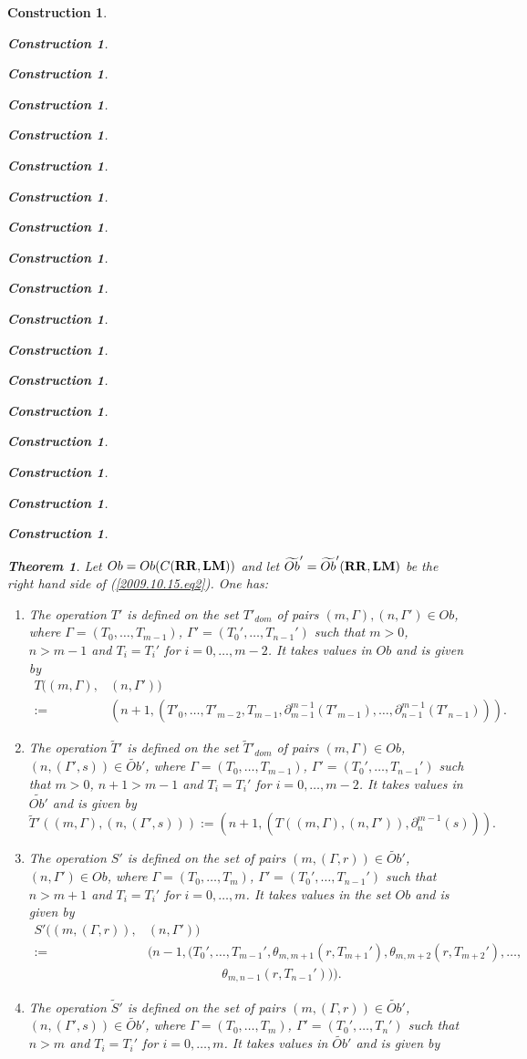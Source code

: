 \documentclass[onecolumn,12pt]{amsart}
\newtheorem{theorem}[proposition]{Theorem}
\numberwithin{proposition}{subsection}
\newtheorem{construction}[proposition]{Construction}
\newcommand{\wt}{\widetilde}
\newcommand{\spc}{{\,\,\,\,\,\,\,}}
\newcommand{\RR}{{\bf RR}}
\newcommand{\LM}{{\bf LM}}
\begin{document}
\begin{construction}
\begin{construction}
\begin{construction}
\begin{construction}
\begin{construction}
\begin{construction}
\begin{construction}
\begin{construction}
\begin{construction}
\begin{construction}
\begin{construction}
\begin{construction}
\begin{construction}
\begin{construction}
\begin{construction}
\begin{construction}
\begin{construction}
\begin{construction}
  
%
\begin{theorem}\label{2015.08.26.th2}
Let $Ob=Ob(C(\RR,\LM))$ and let $\wt{Ob}'=\wt{Ob}'(\RR,\LM)$ be the right hand side of (\ref{2009.10.15.eq2}). One has:
%
\begin{enumerate}
\item The operation $T'$ is defined on the set $T'_{dom}$ of pairs
  $(m,\Gamma),(n,\Gamma')\in Ob$, where $\Gamma=(T_0,\dots,T_{m-1})$,
  $\Gamma'=(T_0',\dots,T_{n-1}')$ such that $m>0$, $n>m-1$ and $T_i=T_i'$ for
  $i=0,\dots,m-2$. It takes values in $Ob$ and is given by
%
\begin{equation*}
  \begin{split}
    T((m,\Gamma),&(n,\Gamma'))
    \\:= &(n+1,(T'_0,\dots,T'_{m-2},T_{m-1},\partial_{m-1}^{m-1}(T'_{m-1}),\dots,\partial_{n-1}^{m-1}(T'_{n-1}))).
  \end{split}
\end{equation*}
%
\item The operation $\wt{T}'$ is defined on the set $\wt{T}'_{dom}$ of pairs
  $(m,\Gamma)\in Ob$, $(n,(\Gamma',s))\in\wt{Ob}'$, where
  $\Gamma=(T_0,\dots,T_{m-1})$, $\Gamma'=(T_0',\dots,T_{n-1}')$ such that
  $m>0$, $n+1>m-1$ and $T_i=T_i'$ for $i=0,\dots,m-2$. It takes values in
  $\wt{Ob'}$ and is given by
%
\[\wt{T}'((m,\Gamma),(n,(\Gamma',s))):=(n+1,(T((m,\Gamma),(n,\Gamma')),\partial_{n}^{m-1}(s))).\]
%
\item The operation $S'$ is defined on the set of pairs $(m,(\Gamma,r))\in
  \wt{Ob}'$, $(n,\Gamma')\in Ob$, where $\Gamma=(T_0,\dots,T_{m})$,
  $\Gamma'=(T_0',\dots,T_{n-1}')$ such that $n>m+1$ and $T_i=T_i'$ for
  $i=0,\dots,m$. It takes values in the set $Ob$ and is given by
%
\begin{equation*}
  \begin{split}
    S'((m,(\Gamma,r)),&(n,\Gamma'))
    \\ :=& (n-1,(T_0',\dots,T_{m-1}',\theta_{m,m+1}(r,T_{m+1}'),\theta_{m,m+2}(r,T_{m+2}'),\dots,
    \\  & \spc\spc\spc\spc\spc
    \theta_{m,n-1}(r,T_{n-1}'))).
  \end{split}
\end{equation*}
%
\item The operation $\wt{S}'$ is defined on the set of pairs $(m,(\Gamma,r))\in
  \wt{Ob}'$, $(n,(\Gamma',s))\in \wt{Ob}'$, where $\Gamma=(T_0,\dots,T_{m})$,
  $\Gamma'=(T_0',\dots,T_{n}')$ such that $n>m$ and $T_i=T_i'$ for
  $i=0,\dots,m$. It takes values in $\wt{Ob}'$ and is given by
%

\end{enumerate}
\end{theorem}
\end{construction}
\end{construction}
\end{construction}
\end{construction}
\end{construction}
\end{construction}
\end{construction}
\end{construction}
\end{construction}
\end{construction}
\end{construction}
\end{construction}
\end{construction}
\end{construction}
\end{construction}
\end{construction}
\end{construction}
\end{construction}
\end{document}
